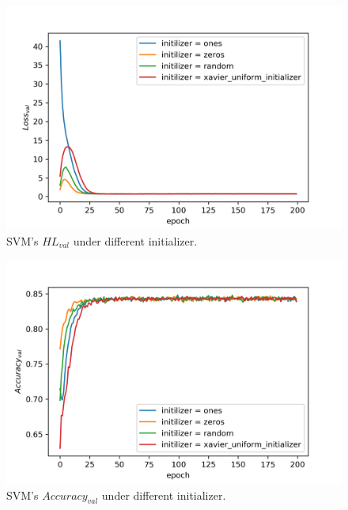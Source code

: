 \documentclass[journal, a4paper]{IEEEtran}
\begin{document}
\begin{figure}[!hbt]
	\begin{center}
		\includegraphics[width=\columnwidth]{svm_init_val_loss}
		\caption{SVM's $HL_{val}$ under different initializer.}
		\label{fig:svm_init_val_loss}
	\end{center}
\end{figure} \par

\begin{figure}[!hbt]
	\begin{center}
		\includegraphics[width=\columnwidth]{svm_init_val_acc}
		\caption{SVM's $Accuracy_{val}$ under different initializer.}
		\label{fig:svm_init_val_acc}
	\end{center}
\end{figure} \par
\end{document}
